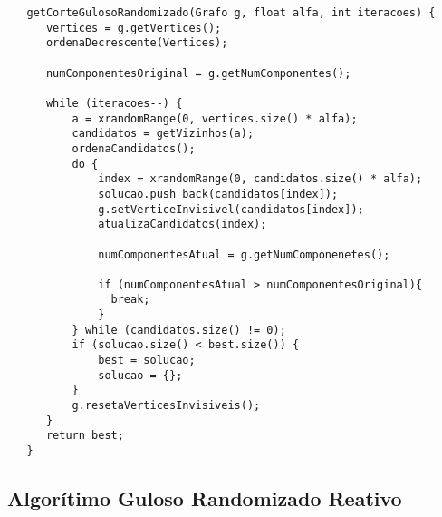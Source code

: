 \documentclass[a4paper, 12pt]{article}
\begin{document}
\begin{lstlisting} 
   getCorteGulosoRandomizado(Grafo g, float alfa, int iteracoes) {
      vertices = g.getVertices();
      ordenaDecrescente(Vertices);

      numComponentesOriginal = g.getNumComponentes();

      while (iteracoes--) {
          a = xrandomRange(0, vertices.size() * alfa);
          candidatos = getVizinhos(a); 
          ordenaCandidatos();
          do {
              index = xrandomRange(0, candidatos.size() * alfa);
              solucao.push_back(candidatos[index]);
              g.setVerticeInvisivel(candidatos[index]);
              atualizaCandidatos(index); 

              numComponentesAtual = g.getNumComponenetes();

              if (numComponentesAtual > numComponentesOriginal){
                break;
              }
          } while (candidatos.size() != 0);
          if (solucao.size() < best.size()) {
              best = solucao;
              solucao = {};
          }
          g.resetaVerticesInvisiveis();
      }
      return best;
   }
 \end{lstlisting}

\subsection{Algorítimo Guloso Randomizado Reativo}
\end{document}

